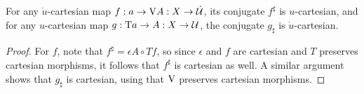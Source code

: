 \documentclass[../thesis.tex]{subfiles}
\begin{document}

\begin{lemma}
  For any $\dot u$-cartesian map $f : a \to {{\mathrm{V}}} A : X \to \dot {{\mathcal{U}}}$, its conjugate $f^\sharp$ is $u$-cartesian,
  and for any $u$-cartesian map $g : {{\mathrm{T}}} a \to A : X \to {\mathcal{U}}$, the conjugate $g_\sharp$ is $\dot u$-cartesian.
\end{lemma}
\begin{proof}
  For $f$, note that $f^\sharp = \epsilon A \circ Tf$, so since $\epsilon$ and $f$ are cartesian and $T$
  preserves cartesian morphisms, it follows that $f^\sharp$ is cartesian as well. A similar argument shows
  that $g_\sharp$ is cartesian, using that ${{\mathrm{V}}}$ preserves cartesian morphisms.
\end{proof}
\end{document}
